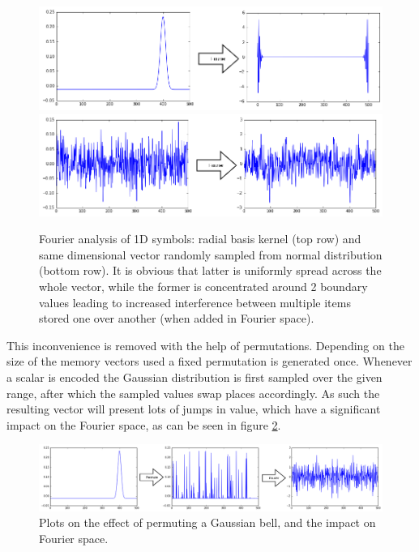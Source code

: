 \documentclass[conference]{IEEEtran}
\begin{document}
	
	\begin{figure}
		\includegraphics[width=\columnwidth]{img/scalar-pre-perm-fft.png}
		\includegraphics[width=\columnwidth]{img/scalar-random-fft.png}
		\caption{Fourier analysis of 1D symbols: radial basis kernel (top row) and same dimensional vector randomly sampled from normal distribution (bottom row). It is obvious that latter is uniformly spread across the whole vector, while the former is concentrated around 2 boundary values leading to increased interference between multiple items stored one over another (when added in Fourier space).}
		\label{fft}
	\end{figure}
	
	This inconvenience is removed with the help of permutations.
Depending on the size of the memory vectors used a fixed permutation is generated once.
Whenever a scalar is encoded the Gaussian distribution is first sampled over the given range, after which the sampled values swap places accordingly.
As such the resulting vector will present lots of jumps in value, which have a significant impact on the Fourier space, as can be seen in figure \ref{perm-fft}.
	
	\begin{figure}
		\includegraphics[width=\columnwidth]{img/scalar-perm-step-fft.png}
		\caption{Plots on the effect of permuting a Gaussian bell, and the impact on Fourier space.}
		\label{perm-fft}
	\end{figure}
	
\end{document}
